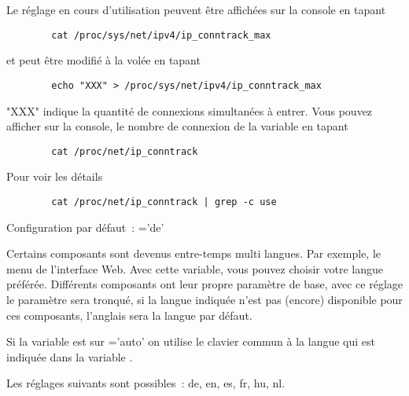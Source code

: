 \begin{description}
    Le réglage en cours d'utilisation peuvent être affichées sur la console en tapant

\begin{example}
\begin{verbatim}
        cat /proc/sys/net/ipv4/ip_conntrack_max
\end{verbatim}
\end{example}

    et peut être modifié à la volée en tapant

\begin{example}
\begin{verbatim}
        echo "XXX" > /proc/sys/net/ipv4/ip_conntrack_max
\end{verbatim}
\end{example}

    "XXX" indique la quantité de connexions simultanées à entrer. Vous pouvez
    afficher sur la console, le nombre de connexion de la variable 
    en tapant

\begin{example}
\begin{verbatim}
        cat /proc/net/ip_conntrack
\end{verbatim}
\end{example}

    Pour voir les détails

\begin{example}
\begin{verbatim}
        cat /proc/net/ip_conntrack | grep -c use
\end{verbatim}
\end{example}


  Configuration par défaut~: ='de'

  Certains composants sont devenus entre-temps multi langues. Par exemple,
  le menu de l'interface Web. Avec cette variable, vous pouvez choisir votre
  langue préférée. Différents composants ont leur propre paramètre de base,
  avec ce réglage le paramètre sera tronqué, si la langue indiquée n'est pas
  (encore) disponible pour ces composants, l'anglais sera la langue par défaut.

  Si la variable est sur ='auto' on utilise le clavier
  commun à la langue qui est indiquée dans la variable .

  Les réglages suivants sont possibles~: de, en, es, fr, hu, nl.

\end{description}
